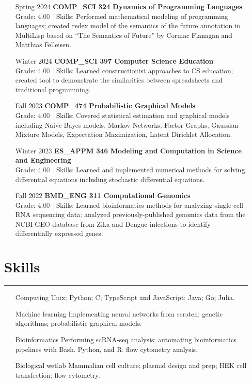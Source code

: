 \documentclass{article}
\begin{document}
\begin{itemize}[leftmargin=1.5in]
    \item[Spring 2024] \textbf{COMP\_SCI 324 Dynamics of Programming Languages}\\
    Grade: 4.00 | Skills: Performed mathematical modeling of programming languages; created redex model of the semantics of the future annotation in MultiLisp based on ``The Semantics of Future'' by Cormac Flanagan and Matthias Felleisen.
    \item[Winter 2024] \textbf{COMP\_SCI 397 Computer Science Education}\\
    Grade: 4.00 | Skills: Learned constructionist approaches to CS education; created tool to demonstrate the similarities between spreadsheets and traditional programming.
    \item[Fall 2023] \textbf{COMP\_474 Probabilistic Graphical Models}\\
    Grade: 4.00 | Skills: Covered statistical estimation and graphical models including Naive Bayes models, Markov Networks, Factor Graphs, Gaussian Mixture Models, Expectation Maximization, Latent Dirichlet Allocation.
    \item[Winter 2023] \textbf{ES\_APPM 346 Modeling and Computation in Science and Engineering}\\
    Grade: 4.00 | Skills: Learned and implemented numerical methods for solving differential equations including stochastic differential equations.
    \item[Fall 2022] \textbf{BMD\_ENG 311 Computational Genomics}\\
    Grade: 4.00 | Skills: Learned bioinformatics methods for analyzing single cell RNA sequencing data; analyzed previously-published genomics data from the NCBI GEO database from Zika and Dengue infections to identify differentially expressed genes.
\end{itemize}

\section*{Skills}
\hrule
\vspace{10pt}

\begin{itemize}[leftmargin=1.5in]
    \item[Computing] Unix; Python; C; TypeScript and JavaScript; Java; Go; Julia.
    \item[Machine learning] Implementing neural networks from scratch; genetic algorithms; probabilistic graphical models.
    \item[Bioinformatics] Performing scRNA-seq analysis; automating bioinformatics pipelines with Bash, Python, and R; flow cytometry analysis.
    \item[Biological wetlab] Mammalian cell culture; plasmid design and prep; HEK cell transfection; flow cytometry.
\end{itemize}
\end{document}
